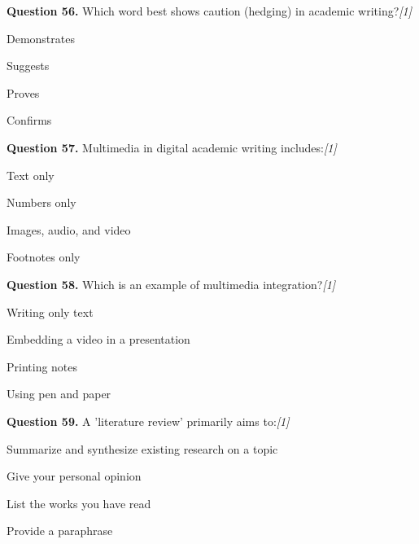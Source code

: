 \documentclass[11pt,a4paper]{article}
\newcommand{\pts}[1]{\hfill   \textit{[#1]}}
\begin{document}
\medskip




\noindent   \textbf{Question 56.} Which word best shows caution (hedging) in academic writing?\pts{1}

\begin{parts}
  \item Demonstrates
  \item Suggests
  \item Proves
  \item Confirms
\end{parts}

\medskip




\noindent   \textbf{Question 57.} Multimedia in digital academic writing includes:\pts{1}

\begin{parts}
  \item Text only
  \item Numbers only
  \item Images, audio, and video
  \item Footnotes only
\end{parts}

\medskip




\noindent   \textbf{Question 58.} Which is an example of multimedia integration?\pts{1}

\begin{parts}
  \item Writing only text
  \item Embedding a video in a presentation
  \item Printing notes
  \item Using pen and paper
\end{parts}

\medskip




\noindent   \textbf{Question 59.} A 'literature review' primarily aims to:\pts{1}

\begin{parts}
  \item Summarize and synthesize existing research on a topic
  \item Give your personal opinion
  \item List the works you have read
  \item Provide a paraphrase
\end{parts}

\medskip
\end{document}

